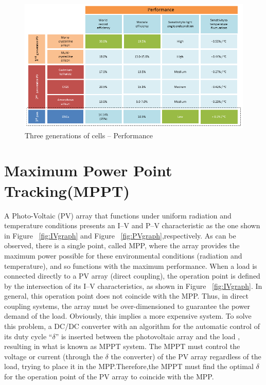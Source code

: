   
  \begin{figure}[H]
  \begin{center}
  \includegraphics[width=\textwidth]{images/3rd_gen}
  \caption{ Three generations of cells –  Performance}
  \label{fig:3rd_gen}
  \end{center}
  \end{figure}
 
 
   
\section{Maximum Power Point Tracking(MPPT)}

A Photo-Voltaic (PV) array that functions under uniform radiation and temperature conditions presents an I–V and P–V characteristic as the one shown in Figure ~\ref{fig:IVgraph} and Figure ~\ref{fig:PVgraph},respectively. As can be observed, there is a single point, called \ac{MPP}, where the array provides the maximum power possible for these environmental conditions (radiation and temperature), and so functions with the maximum performance. When a load is connected directly to a PV array (direct coupling), the operation point is defined by the intersection of its I–V characteristics, as shown in Figure ~\ref{fig:IVgraph}. In general, this operation point does not coincide with the \ac{MPP}. Thus, in direct coupling systems, the array must be over-dimensioned to guarantee the power demand of the load. Obviously, this implies a more expensive system. To solve this problem, a DC/DC  converter with an algorithm for the automatic control of its duty cycle “${\delta}$” is inserted between the photovoltaic array and the load , resulting in what is known as \ac{MPPT} system. The MPPT must control the voltage or current (through the ${\delta}$ the converter) of the PV array regardless of the load, trying to place it in the \ac{MPP}.Therefore,the MPPT must find the optimal ${\delta}$ for the operation point of the PV array to coincide with the \ac{MPP}\cite{enrique2010reliable}.\\


